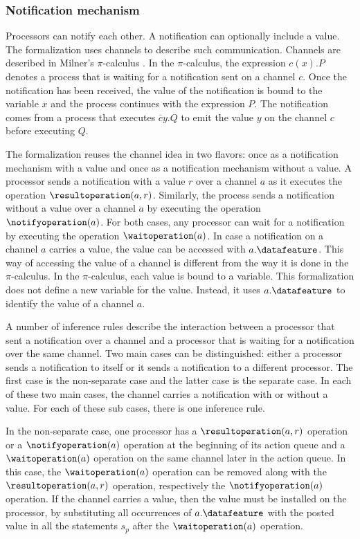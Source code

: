 \subsubsection{Notification mechanism}\label{sec:notification mechanism}
Processors can notify each other. A notification can optionally include a value. The formalization uses channels to describe such communication. Channels are described in Milner's $\pi$-calculus \cite{milner:1999:Pi_calculus}. In the $\pi$-calculus, the expression $c(x).P$ denotes a process that is waiting for a notification sent on a channel $c$. Once the notification has been received, the value of the notification is bound to the variable $x$ and the process continues with the expression $P$. The notification comes from a process that executes $\overline{c}y.Q$ to emit the value $y$ on the channel $c$ before executing $Q$.

The formalization reuses the channel idea in two flavors: once as a notification mechanism with a value and once as a notification mechanism without a value. A processor sends a notification with a value $r$ over a channel $a$ as it executes the operation $\resultoperation(a, r)$. Similarly, the process sends a notification without a value over a channel $a$ by executing the operation $\notifyoperation(a)$. For both cases, any processor can wait for a notification by executing the operation $\waitoperation(a)$. In case a notification on a channel $a$ carries a value, the value can be accessed with $a.\datafeature$. This way of accessing the value of a channel is different from the way it is done in the $\pi$-calculus. In the $\pi$-calculus, each value is bound to a variable. This formalization does not define a new variable for the value. Instead, it uses $a.\datafeature$ to identify the value of a channel $a$.

A number of inference rules describe the interaction between a processor that sent a notification over a channel and a processor that is waiting for a notification over the same channel. Two main cases can be distinguished: either a processor sends a notification to itself or it sends a notification to a different processor. The first case is the non-separate case and the latter case is the separate case. In each of these two main cases, the channel carries a notification with or without a value. For each of these sub cases, there is one inference rule.

In the non-separate case, one processor has a $\resultoperation(a, r)$ operation or a $\notifyoperation(a)$ operation at the beginning of its action queue and a $\waitoperation(a)$ operation on the same channel later in the action queue. In this case, the $\waitoperation(a)$ operation can be removed along with the $\resultoperation(a, r)$ operation, respectively the $\notifyoperation(a)$ operation. If the channel carries a value, then the value must be installed on the processor, by substituting all occurrences of $a.\datafeature$ with the posted value in all the statements $s_{p}$ after the $\waitoperation(a)$ operation.


